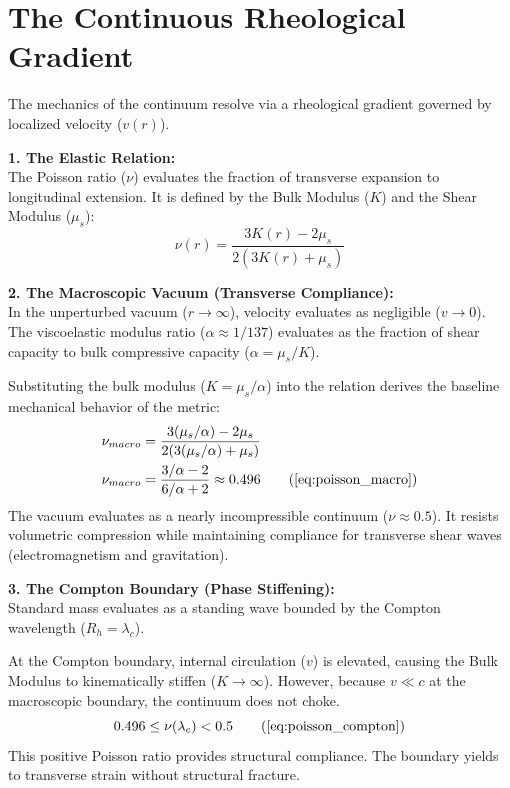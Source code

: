\section{The Continuous Rheological Gradient}
\label{sec:deriv_rheological_gradient}

The mechanics of the continuum resolve via a rheological gradient governed by localized velocity ($v(r)$). 

\textbf{1. The Elastic Relation:} \\
The Poisson ratio ($\nu$) evaluates the fraction of transverse expansion to longitudinal extension. It is defined by the Bulk Modulus ($K$) and the Shear Modulus ($\mu_s$):
\begin{equation}
    \nu(r) = \frac{3K(r) - 2\mu_s}{2(3K(r) + \mu_s)} 
\end{equation}

\textbf{2. The Macroscopic Vacuum (Transverse Compliance):} \\
In the unperturbed vacuum ($r \to \infty$), velocity evaluates as negligible ($v \to 0$). The viscoelastic modulus ratio ($\alpha \approx 1/137$) evaluates as the fraction of shear capacity to bulk compressive capacity ($\alpha = \mu_s / K$). 

Substituting the bulk modulus ($K = \mu_s / \alpha$) into the relation derives the baseline mechanical behavior of the metric: 
\begin{align}
    \nu_{macro} &= \frac{3(\mu_s / \alpha) - 2\mu_s}{2(3(\mu_s / \alpha) + \mu_s)} \nonumber \\
    \nu_{macro} &= \frac{3/\alpha - 2}{6/\alpha + 2} \approx 0.496 \tag{\ref{eq:poisson_macro}} 
\end{align}
The vacuum evaluates as a nearly incompressible continuum ($\nu \approx 0.5$). It resists volumetric compression while maintaining compliance for transverse shear waves (electromagnetism and gravitation).

\textbf{3. The Compton Boundary (Phase Stiffening):} \\
Standard mass evaluates as a standing wave bounded by the Compton wavelength ($R_h = \lambda_c$). 

At the Compton boundary, internal circulation ($v$) is elevated, causing the Bulk Modulus to kinematically stiffen ($K \to \infty$). However, because $v \ll c$ at the macroscopic boundary, the continuum does not choke. 
\begin{equation}
    0.496 \le \nu(\lambda_c) < 0.5 \tag{\ref{eq:poisson_compton}} 
\end{equation}
This positive Poisson ratio provides structural compliance. The boundary yields to transverse strain without structural fracture.

